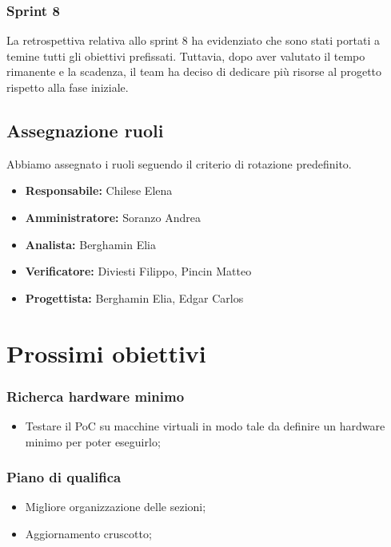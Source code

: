 \subsubsection{Sprint 8}
La retrospettiva relativa allo sprint 8 ha evidenziato che sono stati portati a temine tutti gli obiettivi prefissati.
Tuttavia, dopo aver valutato il tempo rimanente e la scadenza, il team ha deciso di dedicare più risorse al progetto rispetto alla fase iniziale.

\subsection{Assegnazione ruoli}
Abbiamo assegnato i ruoli seguendo il criterio di rotazione predefinito.
\begin{itemize}
    \item \textbf{Responsabile:} Chilese Elena
    \item \textbf{Amministratore:} Soranzo Andrea
    \item \textbf{Analista:} Berghamin Elia
    \item \textbf{Verificatore:} Diviesti Filippo, Pincin Matteo
    \item  \textbf{Progettista:} Berghamin Elia, Edgar Carlos
\end{itemize}
\newpage

\section{Prossimi obiettivi}

\subsubsection{Richerca hardware minimo}
\begin{itemize}
    \item Testare il PoC su macchine virtuali in modo tale da definire un hardware minimo per poter eseguirlo;
\end{itemize}

\subsubsection{Piano di qualifica}
\begin{itemize}
    \item Migliore organizzazione delle sezioni;
    \item Aggiornamento cruscotto;
\end{itemize}

